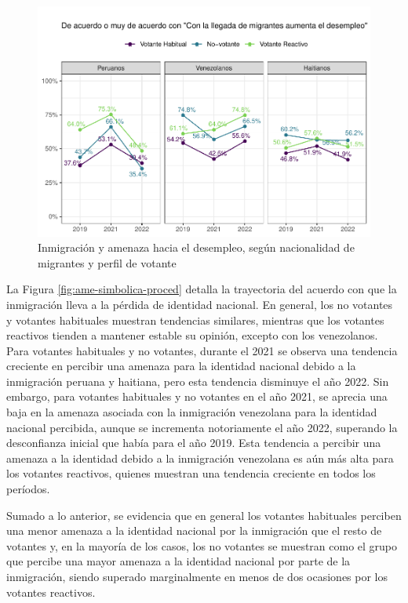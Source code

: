 \documentclass[
  12pt,
]{book}
\begin{document}
\begin{figure}

{\centering \includegraphics{reporte-elsoc_files/figure-latex/ame-realista-proced-1} 

}

\caption{Inmigración y amenaza hacia el desempleo, según nacionalidad de migrantes y perfil de votante}\label{fig:ame-realista-proced}
\end{figure}

La Figura \ref{fig:ame-simbolica-proced} detalla la trayectoria del acuerdo con que la inmigración lleva a la pérdida de identidad nacional. En general, los no votantes y votantes habituales muestran tendencias similares, mientras que los votantes reactivos tienden a mantener estable su opinión, excepto con los venezolanos. Para votantes habituales y no votantes, durante el 2021 se observa una tendencia creciente en percibir una amenaza para la identidad nacional debido a la inmigración peruana y haitiana, pero esta tendencia disminuye el año 2022. Sin embargo, para votantes habituales y no votantes en el año 2021, se aprecia una baja en la amenaza asociada con la inmigración venezolana para la identidad nacional percibida, aunque se incrementa notoriamente el año 2022, superando la desconfianza inicial que había para el año 2019. Esta tendencia a percibir una amenaza a la identidad debido a la inmigración venezolana es aún más alta para los votantes reactivos, quienes muestran una tendencia creciente en todos los períodos.

Sumado a lo anterior, se evidencia que en general los votantes habituales perciben una menor amenaza a la identidad nacional por la inmigración que el resto de votantes y, en la mayoría de los casos, los no votantes se muestran como el grupo que percibe una mayor amenaza a la identidad nacional por parte de la inmigración, siendo superado marginalmente en menos de dos ocasiones por los votantes reactivos.
\end{document}
